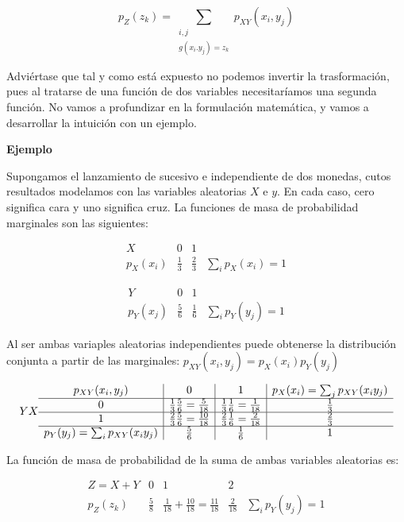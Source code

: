\documentclass[11pt]{article}
\begin{document}
\[p_Z(z_k) = \sum_{\substack{i,j \\ g(x_i.y_j) = z_k}}p_{XY}(x_i, y_j)\]

Adviértase que tal y como está expuesto no podemos invertir la
trasformación, pues al tratarse de una función de dos variables
necesitaríamos una segunda función. No vamos a profundizar en la
formulación matemática, y vamos a desarrollar la intuición con un
ejemplo.

    \textbf{Ejemplo}

Supongamos el lanzamiento de sucesivo e independiente de dos monedas,
cutos resultados modelamos con las variables aleatorias \(X\) e \(y\).
En cada caso, cero significa cara y uno significa cruz. La funciones de
masa de probabilidad marginales son las siguientes:

\[
\begin{array}{c|cc|c}
X & 0 & 1 \\
\hline
p_X(x_i) & \frac{1}{3} & \frac{2}{3}  & \sum_i p_X(x_i) = 1
\end{array}
\]

\[
\begin{array}{c|cc|c}
Y & 0 & 1 \\
\hline
p_Y(x_j) & \frac{5}{6} & \frac{1}{6}  & \sum_i p_Y(y_j) = 1
\end{array}
\]

    Al ser ambas variaples aleatorias independientes puede obtenerse la
distribución conjunta a partir de las marginales:
\(p_{XY}(x_i,y_j)=p_X(x_i)p_Y(y_j)\)

\[
Y \\X \begin{array}{c|c|c|c}
p_{XY}(x_{i}, y_{j}) & 0 & 1 & p_{X}(x_{i}) = \sum_j p_{XY}(x_{i}y_{j})\\
\hline
0 & \frac{1}{3}\frac{5}{6} = \frac{5}{18} & \frac{1}{3}\frac{1}{6} = \frac{1}{18} & \frac{1}{3}\\
\hline
1 & \frac{2}{3}\frac{5}{6} = \frac{10}{18} & \frac{2}{3}\frac{1}{6} = \frac{2}{18} & \frac{2}{3}\\
\hline
p_{Y}(y_{j}) = \sum_i p_{XY}(x_{i}y_{j}) & \frac{5}{6} & \frac{1}{6} & 1
\end{array}
\]

La función de masa de probabilidad de la suma de ambas variables
aleatorias es:

\[
\begin{array}{c|c|c|c|c}
Z = X+Y & 0 & 1 & 2\\
\hline
p_Z(z_k) & \frac{5}{8} & \frac{1}{18} +\frac{10}{18} = \frac{11}{18} &\frac{2}{18}  & \sum_i p_Y(y_j) = 1
\end{array}
\]
\end{document}
